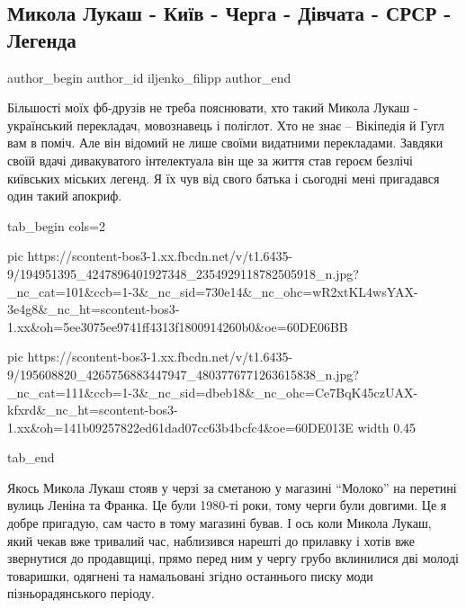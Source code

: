  
 
 
 
 
 
\subsection{Микола Лукаш - Київ - Черга - Дівчата - СРСР - Легенда}
\label{sec:31_05_2021.fb.iljenko_filipp.1.legenda_kiev_mykola_lukash_ochered}
\ifcmt
 author_begin
   author_id iljenko_filipp
 author_end
\fi

Більшості моїх фб-друзів не треба пояснювати, хто такий Микола Лукаш -
український перекладач, мовознавець і поліглот. Хто не знає – Вікіпедія й Гугл
вам в поміч. Але він відомий не лише своїми видатними перекладами. Завдяки
своїй вдачі дивакуватого інтелектуала він ще за життя став героєм безлічі
київських міських легенд. Я їх чув від свого батька і сьогодні мені пригадався
один такий апокриф.

\ifcmt
tab_begin cols=2

  pic https://scontent-bos3-1.xx.fbcdn.net/v/t1.6435-9/194951395_4247896401927348_2354929118782505918_n.jpg?_nc_cat=101&ccb=1-3&_nc_sid=730e14&_nc_ohc=wR2xtKL4wsYAX-3e4g8&_nc_ht=scontent-bos3-1.xx&oh=5ee3075ee9741ff4313f1800914260b0&oe=60DE06BB

  pic https://scontent-bos3-1.xx.fbcdn.net/v/t1.6435-9/195608820_4265756883447947_4803776771263615838_n.jpg?_nc_cat=111&ccb=1-3&_nc_sid=dbeb18&_nc_ohc=Ce7BqK45czUAX-kfxrd&_nc_ht=scontent-bos3-1.xx&oh=141b09257822ed61dad07cc63b4bcfc4&oe=60DE013E
  width 0.45

tab_end
\fi

Якось Микола Лукаш стояв у черзі за сметаною у магазині \enquote{Молоко} на перетині
вулиць Леніна та Франка. Це були 1980-ті роки, тому черги були довгими. Це я
добре пригадую, сам часто в тому магазині бував. І ось коли Микола Лукаш, який
чекав вже тривалий час, наблизився нарешті до прилавку і хотів вже звернутися
до продавщиці, прямо перед ним у чергу грубо вклинилися дві молоді товаришки,
одягнені та намальовані згідно останнього писку моди пізньорадянського періоду. 

